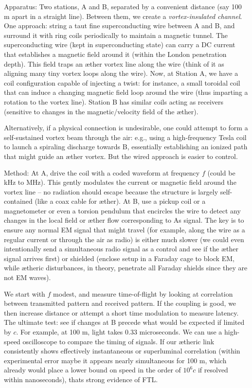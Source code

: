 Apparatus: Two stations, A and B, separated by a convenient distance (say 100 m apart in a straight line). Between them, we create a \textit{vortex-insulated channel}. One approach: string a taut fine superconducting wire between A and B, and surround it with ring coils periodically to maintain a magnetic tunnel. The superconducting wire (kept in superconducting state) can carry a DC current that establishes a magnetic field around it (within the London penetration depth). This field traps an æther vortex line along the wire (think of it as aligning many tiny vortex loops along the wire). Now, at Station A, we have a coil configuration capable of injecting a twist: for instance, a small toroidal coil that can induce a changing magnetic field loop around the wire (thus imparting a rotation to the vortex line). Station B has similar coils acting as receivers (sensitive to changes in the magnetic/velocity field of the æther).


Alternatively, if a physical connection is undesirable, one could attempt to form a self-sustained vortex beam through the air: e.g., using a high-frequency Tesla coil to launch a spiraling discharge towards B, essentially establishing an ionized path that might guide an æther vortex. But the wired approach is easier to control.


Method: At A, drive the coil with a coded waveform at frequency $f$ (could be kHz to MHz). This gently modulates the current or magnetic field around the vortex line – no radiation should escape because the structure is largely self-contained (like a coax cable for æther). At B, use a pickup coil or a magnetometer or even a torsion pendulum that encircles the wire to detect any changes in the local field or æther flow corresponding to A\rqs s signal. The key is to ensure any normal EM signal that might travel (for example, along the wire as a regular current or through the air as radio) is either much slower (we could even intentionally send a simultaneous radio signal as a control and see if the æther signal arrives first) or shielded (enclose setup in a Faraday cage to block EM, while ætheric disturbances, in theory, penetrate all Faraday shields since they are not EM waves).


We start with $f$ modest, and measure time-of-flight by looking at correlation between transmitted pattern and received pattern. If the coupling is good, we then increase distance or attempt a short time modulation to measure latency. The ultimate test: see if changes at B precede what would be expected if limited by $c$. For example, at 100 m, light takes 0.33 microseconds. We can use a high-speed oscilloscope to compare the timing of signals. If our ætheric link consistently shows effectively instantaneous or superluminal correlation (within experimental error maybe it appears nearly simultaneous for 100 m, which already would place a lower bound on speed in the order of $10^6 c$ if resolved within nanoseconds), that\rqs s strong evidence of FTL.


